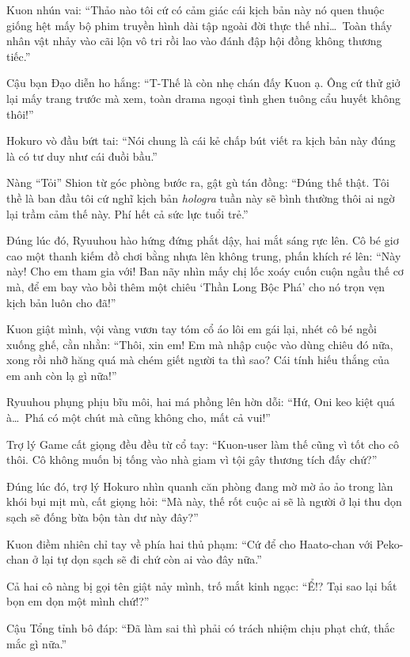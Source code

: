 \documentclass[../main.tex]{subfiles}
\begin{document}
Kuon nhún vai: ``Thảo nào tôi cứ có cảm giác cái kịch bản này nó quen thuộc giống hệt mấy bộ phim truyền hình dài tập ngoài đời thực thế nhỉ\dots\ Toàn thấy nhân vật nhảy vào cãi lộn vô tri rồi lao vào đánh đập hội đồng không thương tiếc.''

Cậu bạn Đạo diễn ho hắng: ``T-Thế là còn nhẹ chán đấy Kuon ạ. Ông cứ thử giở lại mấy trang trước mà xem, toàn drama ngoại tình ghen tuông cẩu huyết không thôi!''

Hokuro vò đầu bứt tai: ``Nói chung là cái kẻ chấp bút viết ra kịch bản này đúng là có tư duy như cái đuồi bầu.''

Nàng ``Tỏi'' Shion từ góc phòng bước ra, gật gù tán đồng: ``Đúng thế thật. Tôi thề là ban đầu tôi cứ nghĩ kịch bản \textit{hologra} tuần này sẽ bình thường thôi ai ngờ lại trầm cảm thế này. Phí hết cả sức lực tuổi trẻ.''

Đúng lúc đó, Ryuuhou hào hứng đứng phắt dậy, hai mắt sáng rực lên. Cô bé giơ cao một thanh kiếm đồ chơi bằng nhựa lên không trung, phấn khích ré lên: ``Này này! Cho em tham gia với! Ban nãy nhìn mấy chị lốc xoáy cuốn cuộn ngầu thế cơ mà, để em bay vào bồi thêm một chiêu `Thần Long Bộc Phá' cho nó trọn vẹn kịch bản luôn cho đã!''

Kuon giật mình, vội vàng vươn tay tóm cổ áo lôi em gái lại, nhét cô bé ngồi xuống ghế, cằn nhằn: ``Thôi, xin em! Em mà nhập cuộc vào dùng chiêu đó nữa, xong rồi nhỡ hăng quá mà chém giết người ta thì sao? Cái tính hiếu thắng của em anh còn lạ gì nữa!''

Ryuuhou phụng phịu bĩu môi, hai má phồng lên hờn dỗi: ``Hứ, Oni keo kiệt quá à\dots\ Phá có một chút mà cũng không cho, mất cả vui!''

Trợ lý Game cất giọng đều đều từ cổ tay: ``Kuon-user làm thế cũng vì tốt cho cô thôi. Cô không muốn bị tống vào nhà giam vì tội gây thương tích đấy chứ?''

Đúng lúc đó, trợ lý Hokuro nhìn quanh căn phòng đang mờ mờ ảo ảo trong làn khói bụi mịt mù, cất giọng hỏi: ``Mà này, thế rốt cuộc ai sẽ là người ở lại thu dọn sạch sẽ đống bừa bộn tàn dư này đây?''

Kuon điềm nhiên chỉ tay về phía hai thủ phạm: ``Cứ để cho Haato-chan với Peko-chan ở lại tự dọn sạch sẽ đi chứ còn ai vào đây nữa.''

Cả hai cô nàng bị gọi tên giật nảy mình, trố mắt kinh ngạc: ``Ể!? Tại sao lại bắt bọn em dọn một mình chứ!?''

Cậu Tổng tỉnh bô đáp: ``Đã làm sai thì phải có trách nhiệm chịu phạt chứ, thắc mắc gì nữa.''
\end{document}
